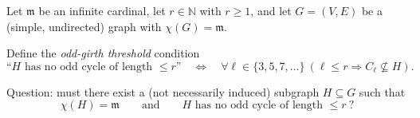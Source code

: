 Let $\mathfrak m$ be an infinite cardinal, let $r\in\mathbb{N}$ with $r\ge 1$, and let $G=(V,E)$ be a (simple, undirected) graph with $\chi(G)=\mathfrak m$.

Define the \emph{odd-girth threshold} condition
\[
\text{``$H$ has no odd cycle of length $\le r$''}\quad\Longleftrightarrow\quad
\forall \ell\in\{3,5,7,\dots\}\ (\ell\le r\Rightarrow C_\ell\not\subseteq H).
\]

Question: must there exist a (not necessarily induced) subgraph $H\subseteq G$ such that
\[
\chi(H)=\mathfrak m\qquad\text{and}\qquad H\text{ has no odd cycle of length }\le r\ ?
\]
